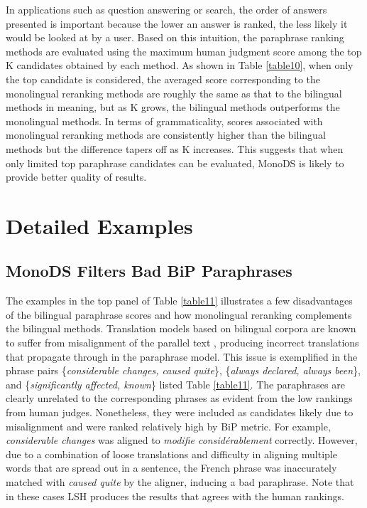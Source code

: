 \documentclass[11pt]{article}
\newcommand{\mnote}[1]{\marginpar{\raggedleft\footnotesize\itshape#1}}
\begin{document}
In applications such as question answering or search, the order of answers presented is important because the lower an answer is ranked, the less likely it would be looked at by a user. Based on this intuition, the paraphrase ranking methods are evaluated using the maximum human judgment score among the top K candidates obtained by each method. As shown in Table \ref{table10}, when only the top candidate is considered, the averaged score corresponding to the monolingual reranking methods are roughly the same as that to the bilingual methods in meaning, but as K grows, the bilingual methods outperforms the monolingual methods. In terms of grammaticality, scores associated with monolingual reranking methods are consistently higher than the bilingual methods but the difference tapers off as K increases. This suggests that when only limited top paraphrase candidates can be evaluated, MonoDS is likely to provide better quality of results.



\section{Detailed Examples}
\subsection{MonoDS Filters Bad BiP Paraphrases}
The examples in the top panel of Table \ref{table11} illustrates a few disadvantages of the bilingual paraphrase scores and how monolingual reranking complements the bilingual methods. Translation models based on bilingual corpora are known to suffer from misalignment of the parallel text \cite{BannardCallisonBurch05}, producing incorrect translations that propagate through in the paraphrase model. This issue is exemplified in the phrase pairs \{\emph{considerable changes, caused quite}\}, \{\emph{always declared, always been}\}, and \{\emph{significantly affected, known}\} listed Table \ref{table11}. The paraphrases are clearly unrelated to the corresponding phrases as evident from the low rankings from human judges. Nonetheless, they were included as candidates likely due to misalignment and were ranked relatively high by BiP metric. For example, \emph{considerable changes} was aligned to \emph{modifie consid{\'e}rablement} correctly. However, due to a combination of loose translations and difficulty in aligning multiple words that are spread out in a sentence, the French phrase was inaccurately matched with \emph{caused quite} by the aligner, inducing a bad paraphrase. Note that in these cases LSH produces the results that agrees with the human rankings.
\end{document}

